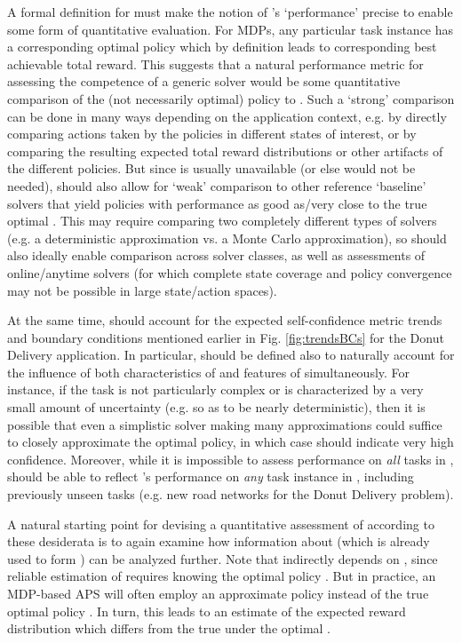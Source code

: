 A formal definition for \xQ{} must make the notion of \solve{}'s `performance' precise to enable some form of quantitative evaluation. For MDPs, any particular task instance \task{} has a corresponding optimal policy \piopt{} which by definition leads to corresponding best achievable total reward. This suggests that a natural performance metric for assessing the competence of a generic solver \solve{} would be some quantitative comparison of the (not necessarily optimal) policy \pigeneric{} to \piopt. Such a `strong' comparison can be done in many ways depending on the application context, e.g. by directly comparing actions taken by the policies in different states of interest, or by comparing the resulting expected total reward distributions or other artifacts of the different policies. 
But since \piopt{} is usually unavailable (or else \solve{} would not be needed), \xQ{} should also allow for `weak' comparison to other reference `baseline' solvers that yield policies with performance as good as/very close to the true optimal \piopt. This may require comparing two completely different types of solvers (e.g. a deterministic approximation vs. a Monte Carlo approximation), so \xQ{} should also ideally enable comparison across solver classes, as well as assessments of online/anytime solvers (for which complete state coverage and policy convergence may not be possible in large state/action spaces).
 
At the same time, \xQ{} should account for the expected self-confidence metric trends and boundary conditions mentioned earlier in Fig. \ref{fig:trendsBCs} for the Donut Delivery application. In particular, \xQ{} should be defined also to naturally account for the influence of both characteristics of \solve{} and features of \task{} simultaneously. For instance, if the task \task{} is not particularly complex or is characterized by a very small amount of uncertainty (e.g. so as to be nearly deterministic), then it is possible that even a simplistic solver making many approximations could suffice to closely approximate the optimal policy, in which case \xQ{} should indicate very high confidence. Moreover, while it is impossible to assess performance on \emph{all} tasks in \taskclass{}, \xQ{} should be able to reflect \solve{}'s performance on \emph{any} task instance \task{} in \taskclass{}, including previously unseen tasks (e.g. new road networks for the Donut Delivery problem). 

A natural starting point for devising a quantitative assessment of \xQ{} according to these desiderata is to again examine how information about \rwdapprox{} (which is already used to form \xO{}) can be analyzed further. 
Note that \xO{} indirectly depends on \xQ{}, since reliable estimation of \rwdoptapprox{} requires knowing the optimal policy \piopt. But in practice, an MDP-based APS will often employ an approximate policy \piapprox{} instead of the true optimal policy \piopt. In turn, this leads to an estimate \rwdapprox{} of the expected reward distribution which differs from the true \rwdopt{} under the optimal \piopt.

